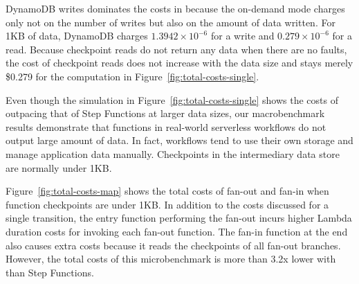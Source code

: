 DynamoDB writes dominates the costs in \name{} because the on-demand mode
charges only not on the number of writes but also on the amount of data
written. For 1KB of data, DynamoDB charges $1.3942 \times 10^{-6}$ for a write
and $0.279 \times 10^{-6}$ for a read. Because checkpoint reads do not return
any data when there are no faults, the cost of checkpoint reads does not
increase with the data size and stays merely \$0.279 for the computation in
Figure~\ref{fig:total-costs-single}.

Even though the simulation in Figure~\ref{fig:total-costs-single} shows the
costs of \name{} outpacing that of Step Functions at larger data sizes, our
macrobenchmark results demonstrate that functions in real-world serverless
workflows do not output large amount of data. In fact, workflows tend to use
their own storage and manage application data manually. Checkpoints in the
\name{} intermediary data store are normally under 1KB. 

Figure~\ref{fig:total-costs-map} shows the total costs of fan-out and fan-in
when function checkpoints are under 1KB. In addition to the costs discussed
for a single transition, the entry function performing the fan-out incurs
higher Lambda duration costs for invoking each fan-out function. The fan-in
function at the end also causes extra costs because it reads the checkpoints
of all fan-out branches. However, the total costs of this microbenchmark is
more than 3.2x lower with \name{} than Step Functions.





